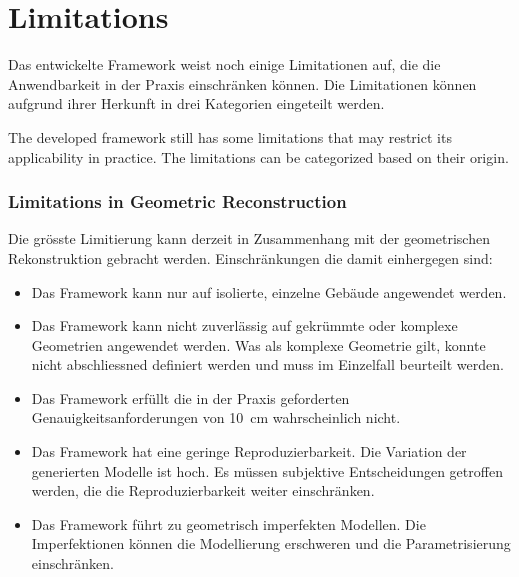 \section{Limitations}
\begin{German}
    Das entwickelte Framework weist noch einige Limitationen auf, die die Anwendbarkeit in der Praxis einschränken können. Die Limitationen können aufgrund ihrer Herkunft in drei Kategorien eingeteilt werden.
\end{German}

\begin{English}
    The developed framework still has some limitations that may restrict its applicability in practice. The limitations can be categorized based on their origin.
\end{English}

\subsubsection{Limitations in Geometric Reconstruction}
\begin{German}
    Die grösste Limitierung kann derzeit in Zusammenhang mit der geometrischen Rekonstruktion gebracht werden. Einschränkungen die damit einhergegen sind:

    \begin{itemize}
        \item Das Framework kann nur auf isolierte, einzelne Gebäude angewendet werden.
        \item Das Framework kann nicht zuverlässig auf gekrümmte oder komplexe Geometrien angewendet werden. Was als komplexe Geometrie gilt, konnte nicht abschliessned definiert werden und muss im Einzelfall beurteilt werden.
        \item Das Framework erfüllt die in der Praxis geforderten Genauigkeitsanforderungen von 10~cm wahrscheinlich nicht.
        \item Das Framework hat eine geringe Reproduzierbarkeit. Die Variation der generierten Modelle ist hoch. Es müssen subjektive Entscheidungen getroffen werden, die die Reproduzierbarkeit weiter einschränken.
        \item Das Framework führt zu geometrisch imperfekten Modellen. Die Imperfektionen können die Modellierung erschweren und die Parametrisierung einschränken. 
    \end{itemize}
\end{German}

